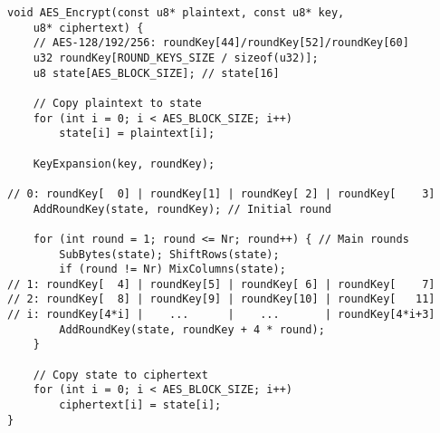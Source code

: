 \begin{lstlisting}[style=C, caption={8-bit AES Encryption},captionpos=t]
void AES_Encrypt(const u8* plaintext, const u8* key,
	u8* ciphertext) {
	// AES-128/192/256: roundKey[44]/roundKey[52]/roundKey[60]
	u32 roundKey[ROUND_KEYS_SIZE / sizeof(u32)];
	u8 state[AES_BLOCK_SIZE]; // state[16]
	
	// Copy plaintext to state
	for (int i = 0; i < AES_BLOCK_SIZE; i++)
		state[i] = plaintext[i];
	
	KeyExpansion(key, roundKey);
	
// 0: roundKey[  0] | roundKey[1] | roundKey[ 2] | roundKey[    3]
	AddRoundKey(state, roundKey); // Initial round
	
	for (int round = 1; round <= Nr; round++) { // Main rounds
		SubBytes(state); ShiftRows(state);
		if (round != Nr) MixColumns(state);
// 1: roundKey[  4] | roundKey[5] | roundKey[ 6] | roundKey[    7]
// 2: roundKey[  8] | roundKey[9] | roundKey[10] | roundKey[   11]
// i: roundKey[4*i] |    ...      |    ...       | roundKey[4*i+3]
		AddRoundKey(state, roundKey + 4 * round);
	}
	
	// Copy state to ciphertext
	for (int i = 0; i < AES_BLOCK_SIZE; i++)
		ciphertext[i] = state[i];
}
\end{lstlisting}

